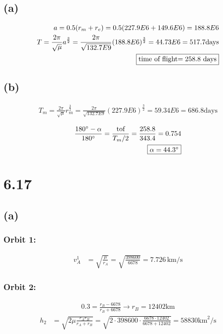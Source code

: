 \documentclass[12 pt]{article}
\begin{document}
\subsection*{(a)}
\begin{align*}
    a=0.5(r_m+r_e)=0.5(227.9E6+149.6E6)=188.8E6 \\
    T=\frac{2\pi}{\sqrt{\mu}}a^{\frac{3}{2}}=\frac{2\pi}{\sqrt{132.7E9}}(188.8E6)^{\frac{3}{2}}=44.73E6=517.7\text{days} \\
    \fbox{time of flight$=258.8$ days}
\end{align*}

\subsection*{(b)}
\begin{align*}
    T_m=\frac{2\pi}{\sqrt{\mu}}r_m^{\frac{3}{2}}=\frac{2\pi}{\sqrt{132.7E9}}(227.9E6)^{\frac{3}{2}}=59.34E6=686.8\text{days}
\end{align*}

\begin{align*}
    \frac{180^{\circ}-\alpha}{180^{\circ}}=\frac{\text{tof}}{T_m/2}=\frac{258.8}{343.4}=0.754 \\
    \fbox{$\alpha=44.3^{\circ}$}
\end{align*}

\pagebreak
\section*{6.17}
\subsection*{(a)}

\subsubsection*{Orbit 1:}
\begin{align*}
    v_A^1 &= \sqrt{\frac{\mu}{r_A}} = \sqrt{\frac{398600}{6678}} = 7.726 \, \text{km/s}
\end{align*}

\subsubsection*{Orbit 2:}
\begin{align*}
    0.3 = \frac{r_B - 6678}{r_B + 6678} \rightarrow r_B = 12402 \text{km}
\end{align*}
\begin{align*}
    h_2 &= \sqrt{2 \mu \frac{r_A r_B}{r_A + r_B}} = \sqrt{2 \cdot 398600 \cdot \frac{6678 \cdot 12402}{6678 + 12402}} = 58830 \text{km}^2/\text{s}
\end{align*}
\end{document}
